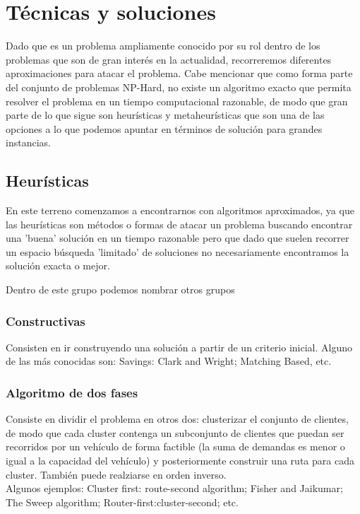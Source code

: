\documentclass[11pt,a4paper]{article}
\begin{document}
\section{Técnicas y soluciones}

Dado que es un problema ampliamente conocido por su rol dentro de los problemas que son de gran interés en la actualidad, recorreremos diferentes aproximaciones para atacar el problema.
Cabe mencionar que como forma parte del conjunto de problemas NP-Hard, no existe un algoritmo exacto que permita resolver el problema en un tiempo computacional razonable, de modo que gran parte de lo que sigue son heurísticas y metaheurísticas que son una de las opciones a lo que podemos apuntar en términos de solución para grandes instancias.
\subsection{Heurísticas}
En este terreno comenzamos a encontrarnos con algoritmos aproximados, ya que las heurísticas son métodos o formas de atacar un problema buscando encontrar una 'buena' solución en un tiempo razonable pero que dado que suelen recorrer un espacio búsqueda 'limitado' de soluciones no necesariamente encontramos la solución exacta o mejor.

Dentro de este grupo podemos nombrar otros grupos
\subsubsection{Constructivas}
Consisten en ir construyendo una solución a partir de un criterio inicial.
Alguno de las más conocidas son: Savings: Clark and Wright; Matching Based, etc.

\subsubsection{Algoritmo de dos fases}
Consiste en dividir el problema en otros dos: clusterizar el conjunto de clientes, de modo que cada cluster contenga un subconjunto de clientes que puedan ser recorridos por un vehículo de forma factible (la suma de demandas es menor o igual a la capacidad del vehículo) y posteriormente construir una ruta para cada cluster. También puede realziarse en orden inverso.\\
Algunos ejemplos: Cluster first: route-second algorithm; Fisher and Jaikumar; The Sweep algorithm; Router-first:cluster-second; etc.
\end{document}
